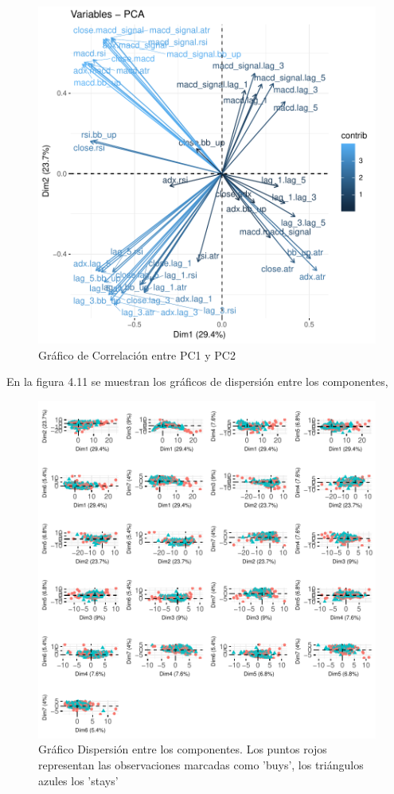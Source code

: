 \documentclass[a4paper,12pt]{Latex/Classes/PhDthesisPSnPDF}
\begin{document}
\begin{figure}[H]
\centering
\includegraphics{main-016}
\caption{Gráfico de Correlación entre PC1 y PC2}
\end{figure}

En la figura 4.11 se muestran los gráficos de dispersión entre los componentes, 


\begin{figure}[H]
\centering
\includegraphics{main-018}
\caption{Gráfico Dispersión entre los componentes. Los puntos rojos representan las observaciones marcadas como 'buys', los triángulos azules los 'stays'}
\end{figure}
\end{document}
